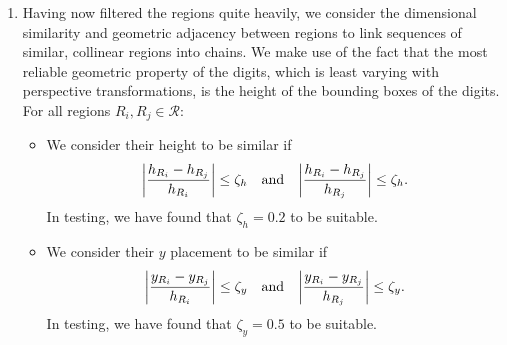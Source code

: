 \documentclass{article}
\begin{document}
\begin{enumerate}
\item
  \label{item:1-adjacency}
  Having now filtered the regions quite heavily, we consider the dimensional
  similarity and geometric adjacency between regions to link sequences of
  similar, collinear regions into chains.
  We make use of the fact that the most reliable geometric property of the
  digits, which is least varying with perspective transformations, is the height
  of the bounding boxes of the digits.
  For all regions $R_{i}, R_{j} \in \mathcal{R}$:
  \begin{itemize}
  \item
    We consider their height to be similar if
    \begin{equation*}
      \lrabs[\bigg]
      {
        \frac
        {
          h_{R_{i}}
          -
          h_{R_{j}}
        }
        {
          h_{R_{i}}
        }
      }
      \leq
      \zeta_{h}
      \qq{and}
      \lrabs[\bigg]
      {
        \frac
        {
          h_{R_{i}}
          -
          h_{R_{j}}
        }
        {
          h_{R_{j}}
        }
      }
      \leq
      \zeta_{h}
      .
    \end{equation*}
    In testing, we have found that $\zeta_{h} = 0.2$ to be suitable.

  \item
    We consider their $y$ placement to be similar if
    \begin{equation*}
      \lrabs[\bigg]
      {
        \frac
        {
          y_{R_{i}}
          -
          y_{R_{j}}
        }
        {
          h_{R_{i}}
        }
      }
      \leq
      \zeta_{y}
      \qq{and}
      \lrabs[\bigg]
      {
        \frac
        {
          y_{R_{i}}
          -
          y_{R_{j}}
        }
        {
          h_{R_{j}}
        }
      }
      \leq
      \zeta_{y}
      .
    \end{equation*}
    In testing, we have found that $\zeta_{y} = 0.5$ to be suitable.


\end{itemize}
\end{enumerate}
\end{document}
